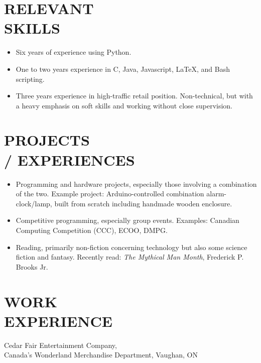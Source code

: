 \documentclass[11pt, margin]{res}
\begin{document}
\begin{resume}
 

\section{RELEVANT \\ SKILLS}   \begin{itemize}[leftmargin=*, itemsep=-2pt]
                        \item Six years of experience using Python.
                        \item One to two years experience in C, Java, Javascript, LaTeX, and Bash scripting.
                        \item Three years experience in high-traffic retail position. Non-technical, but with a heavy emphasis on soft skills and working without close supervision.
                    \end{itemize}

\section{PROJECTS \\ / EXPERIENCES}
            \begin{itemize}[leftmargin=*, itemsep=-2pt]
                \item Programming and hardware projects, especially those involving a combination of the two. Example project: Arduino-controlled combination alarm-clock/lamp, built from scratch including handmade wooden enclosure.
                \item Competitive programming, especially group events. Examples: Canadian Computing Competition (CCC), ECOO, DMPG.
                \item Reading, primarily non-fiction concerning technology but also some science fiction and fantasy. Recently read: {\sl The Mythical Man Month}, Frederick P. Brooks Jr.
            \end{itemize}


\section{WORK \\ EXPERIENCE} 
                Cedar Fair Entertainment Company, \\
                Canada's Wonderland Merchandise Department, Vaughan, ON 
                

\end{resume}
\end{document}
